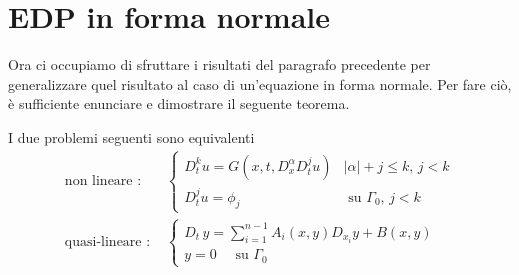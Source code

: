 \newpage
\section{EDP in forma normale}
Ora ci occupiamo di sfruttare i risultati del paragrafo precedente per generalizzare quel risultato al caso di un'equazione in forma normale. Per fare ciò, è sufficiente enunciare e dimostrare il seguente teorema.
\begin{theorem}\label{teonorm}
I due problemi seguenti sono equivalenti
\begin{align*}
\text{non lineare : }&
\begin{cases}
D_{t}^k u = G(x,t, D^\alpha_x D^j_t u) & |\alpha |+ j \leq k, \, j<k \\
D_t^ju = \phi_j & \text{ su } \Gamma_0, \, j<k
\end{cases} \\
\text{quasi-lineare : }&
\begin{cases}
D_t \, y = \sum\limits_{i=1}^{n-1} A_i(x,y)D_{x_i}y+B(x,y) \; \\
y=0 \quad \text{ su } \Gamma_0
\end{cases}
\end{align*}
\end{theorem}

